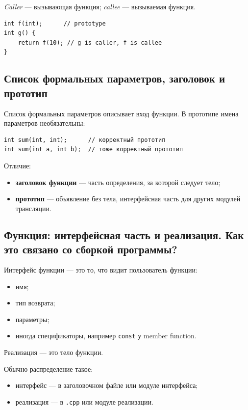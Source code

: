 \begin{definition}
\textit{Caller} — вызывающая функция; \textit{callee} — вызываемая функция.
\end{definition}

\begin{example}
\begin{verbatim}
int f(int);      // prototype
int g() {
    return f(10); // g is caller, f is callee
}
\end{verbatim}
\end{example}

\subsection{Список формальных параметров, заголовок и прототип}
Список формальных параметров описывает вход функции. В прототипе имена параметров необязательны:
\begin{verbatim}
int sum(int, int);      // корректный прототип
int sum(int a, int b);  // тоже корректный прототип
\end{verbatim}

Отличие:
\begin{itemize}
    \item \textbf{заголовок функции} — часть определения, за которой следует тело;
    \item \textbf{прототип} — объявление без тела, интерфейсная часть для других модулей трансляции.
\end{itemize}

\subsection{Функция: интерфейсная часть и реализация. Как это связано со сборкой программы?}
Интерфейс функции — это то, что видит пользователь функции:
\begin{itemize}
    \item имя;
    \item тип возврата;
    \item параметры;
    \item иногда спецификаторы, например \texttt{const} у member function.
\end{itemize}

Реализация — это тело функции.

Обычно распределение такое:
\begin{itemize}
    \item интерфейс — в заголовочном файле или модуле интерфейса;
    \item реализация — в \texttt{.cpp} или модуле реализации.
\end{itemize}

